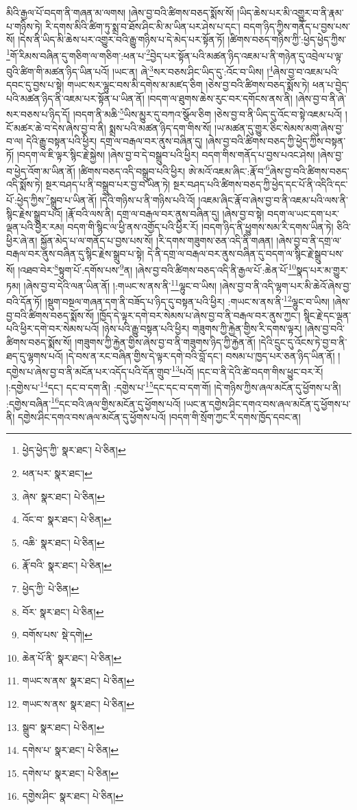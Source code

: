 མིའི་རྒྱལ་པོ་བདག་ནི་གཞན་མ་ལགས། །ཞེས་བྱ་བའི་ཚིགས་བཅད་སྨོས་སོ། །ཡིད་ཆེས་པར་མི་འགྱུར་བ་ནི་རྣམ་པ་གཉིས་ཏེ། རི་དགས་མིའི་ཚིག་ཏུ་སྨྲ་བ་ཐོས་ཤིང་མི་མ་ཡིན་པར་ཤེས་པ་དང་། བདག་ཉིད་ཀྱིས་གནོད་པ་བྱས་པས་སོ། །དེས་ནི་ཡིད་མི་ཆེས་པར་འགྱུར་བའི་རྒྱུ་གཉིས་པ་དེ་མེད་པར་སྟོན་ཏོ། །ཚིགས་བཅད་གཉིས་ཀྱི་:ཕྱེད་ཕྱེད་ཀྱིས་\footnote{ཕྱེད་ཕྱེད་ཀྱི་  སྣར་ཐང་།  པེ་ཅིན། }གོ་རིམས་བཞིན་དུ་གཅིག་ལ་གཅིག་:ཕན་པ་\footnote{ཕན་པར་  སྣར་ཐང་། }བྱེད་པར་སྟོན་པའི་མཚན་ཉིད་འཇམ་པ་ནི་གཉེན་དུ་འབྲེལ་པ་ལྟ་བུའི་ཚིག་གི་མཚན་ཉིད་ཡིན་པའོ། །ཡང་ན། ཞེ་\footnote{ཞེས་  སྣར་ཐང་།  པེ་ཅིན། }སར་བཅས་ཤིང་ཡིད་དུ་:འོང་བ་ཡིས། །\footnote{འོང་བ་  སྣར་ཐང་།  པེ་ཅིན། }ཞེས་བྱ་བ་འཇམ་པའི་དབང་དུ་བྱས་པ་སྟེ། གཡང་སར་ལྷུང་བས་མི་དགེས་མ་མཛད་ཅིག །ཅེས་བྱ་བའི་ཚིགས་བཅད་སྨོས་ཏེ། ཕན་པ་བྱེད་པའི་མཚན་ཉིད་ནི་འཇམ་པར་སྟོན་པ་ཡིན་ནོ། །བདག་ལ་ཐུགས་ཆེས་རུང་བར་དགོངས་ནས་ནི། །ཞེས་བྱ་བ་ནི་ཞེ་སར་བཅས་པ་ཉིད་དོ། །བདག་ནི་མཆི་\footnote{འཆི་  སྣར་ཐང་།  པེ་ཅིན། }ཡིས་མྱུར་དུ་བཀའ་སྩོལ་ཅིག །ཅེས་བྱ་བ་ནི་ཡིད་དུ་འོང་བ་སྟེ་འཇམ་པའོ། །ངོ་མཚར་ཆེ་བ་དེས་ཞེས་བྱ་བ་ནི། སྨྲས་པའི་མཚན་ཉིད་དག་གིས་སོ། །ཡ་མཚན་དུ་གྱུར་ཅིང་སེམས་མགུ་ཞེས་བྱ་བ་ལ། དེའི་རྒྱུ་བསྟན་པའི་ཕྱིར། དགྲ་ལ་བརྒལ་བར་ནུས་བཞིན་དུ། །ཞེས་བྱ་བའི་ཚིགས་བཅད་ཀྱི་ཕྱེད་ཀྱིས་བསྟན་ཏོ། །བདག་ལ་ཇི་ལྟར་སྙིང་རྗེ་སྐྱེས། །ཞེས་བྱ་བ་དེ་བསྒྲུབ་པའི་ཕྱིར། བདག་གིས་གནོད་པ་བྱས་པའང་ཤེས། །ཞེས་བྱ་བ་ཕྱེད་འོག་མ་ཡིན་ནོ། །ཚིགས་བཅད་འདི་བསྒྲུབ་པའི་ཕྱིར། ཨེ་མའོ་འཇམ་ཞིང་:རྣོ་བ་\footnote{རྣོ་བའི་  སྣར་ཐང་།  པེ་ཅིན། }ཞེས་བྱ་བའི་ཚིགས་བཅད་འདི་སྨོས་ཏེ། སྔར་བཤད་པ་ནི་བསྒྲུབ་པར་བྱ་བ་ཡིན་ཏེ། སྔར་བཤད་པའི་ཚིགས་བཅད་ཀྱི་ཕྱེད་དང་པོ་ནི་འདིའི་དང་པོ་:ཕྱེད་ཀྱིས་\footnote{ཕྱེད་ཀྱི་  པེ་ཅིན། }སྒྲུབ་པ་ཡིན་ནོ། །དེའི་གཉིས་པ་ནི་གཉིས་པའི་འོ། །འཇམ་ཞིང་རྣོ་བ་ཞེས་བྱ་བ་ནི་འཇམ་པའི་ལས་ནི་སྙིང་རྗེས་སྒྲུབ་པའོ། །རྣོ་བའི་ལས་ནི། དགྲ་ལ་བརྒལ་བར་ནུས་བཞིན་དུ། །ཞེས་བྱ་བ་སྟེ། བདག་ལ་ཡང་དག་པར་ལྡན་པའི་ཕྱིར་རམ། བདག་གི་སྙིང་ལ་ཕྱི་ནས་འགྱོད་པའི་ཕྱིར་རོ། །བདག་ཉིད་ནི་ཕྱུགས་སམ་རི་དགས་ཡིན་ཏེ། ཅིའི་ཕྱིར་ཞེ་ན། སྐྱོན་མེད་པ་ལ་གནོད་པ་བྱས་པས་སོ། །རི་དགས་གཟུགས་ཅན་འདི་ནི་གཞན། །ཞེས་བྱ་བ་ནི་དགྲ་ལ་བརྒལ་བར་ནུས་བཞིན་དུ་སྙིང་རྗེས་སྒྲུབ་པ་སྟེ། དེ་ནི་དགྲ་ལ་བརྒལ་བར་ནུས་བཞིན་དུ་བདག་ལ་སྙིང་རྗེ་སྒྲུབ་པས་སོ། །འཐབ་བེར་\footnote{བོར་  སྣར་ཐང་།  པེ་ཅིན། }སྟུག་པོ་:དགོས་པས་\footnote{བགོས་པས་  སྡེ་དགེ། }ན། །ཞེས་བྱ་བའི་ཚིགས་བཅད་འདི་ནི་རྒྱལ་པོ་:ཆེན་པོ་\footnote{ཆེན་པོ་ནི་  སྣར་ཐང་།  པེ་ཅིན། }སྣད་པར་མ་གྱུར་ཏམ། །ཞེས་བྱ་བ་དེའི་ལན་ཡིན་ནོ། །:གཡང་ས་ནས་ནི་\footnote{གཡང་ས་ནས་  སྣར་ཐང་།  པེ་ཅིན། }ལྷུང་བ་ཡིས། །ཞེས་བྱ་བ་ནི་འདི་ལྷག་པར་མི་ཆེའོ་ཞེས་བྱ་བའི་དོན་ཏོ། །སྡུག་བསྔལ་གཞན་དག་ནི་བཟོད་པ་ཉིད་དུ་བསྟན་པའི་ཕྱིར། :གཡང་ས་ནས་ནི་\footnote{གཡང་ས་ནས་  སྣར་ཐང་།  པེ་ཅིན། }ལྷུང་བ་ཡིས། །ཞེས་བྱ་བའི་ཚིགས་བཅད་སྨོས་སོ། །ཁྱོད་དེ་ལྟར་དགེ་བར་སེམས་པ་ཞེས་བྱ་བ་ནི་བརྒལ་བར་ནུས་ཀྱང་། སྙིང་རྗེ་དང་ལྡན་པའི་ཕྱིར་དགེ་བར་སེམས་པའོ། །ཉེས་པའི་རྒྱུ་བསྟན་པའི་ཕྱིར། གཟུགས་ཀྱི་རྐྱེན་གྱིས་རི་དགས་ལྟར། །ཞེས་བྱ་བའི་ཚིགས་བཅད་སྨོས་སོ། །གཟུགས་ཀྱི་རྐྱེན་གྱིས་ཞེས་བྱ་བ་ནི་གཟུགས་ཉིད་ཀྱི་རྐྱེན་ནོ། །དེའི་དྲུང་དུ་འོངས་ཏེ་བྱ་བ་ནི་ཐད་དུ་ལྷགས་པའོ། །དེ་བས་ན་རང་བཞིན་གྱིས་དེ་ལྟར་དགེ་བའི་བློ་དང་། བསམ་པ་ཁྱད་པར་ཅན་ཉིད་ཡིན་ནོ། །དགྱེས་པ་ཞེས་བྱ་བ་ནི་མངོན་པར་འདོད་པའི་དོན་གྲུབ་\footnote{སྒྲུབ་  སྣར་ཐང་།  པེ་ཅིན། }པའོ། །དང་བ་ནི་དེའི་ཚེ་བདག་གིས་ཕྱུང་བར་རོ། །:དགྱེས་པ་\footnote{དགེས་པ་  སྣར་ཐང་།  པེ་ཅིན། }དང་། དང་བ་དག་ནི། :དགྱེས་པ་\footnote{དགེས་པ་  སྣར་ཐང་།  པེ་ཅིན། }དང་དང་བ་དག་གོ། །དེ་གཉིས་ཀྱིས་ཞལ་མངོན་དུ་ཕྱོགས་པ་ནི། :དགྱེས་བཞིན་\footnote{དགྱེས་ཤིང་  སྣར་ཐང་།  པེ་ཅིན། }དང་བའི་ཞལ་གྱིས་མངོན་དུ་ཕྱོགས་པའོ། །ཡང་ན་དགྱེས་ཤིང་དགའ་བས་ཞལ་མངོན་དུ་ཕྱོགས་པ་ནི། དགྱེས་ཤིང་དགའ་བས་ཞལ་མངོན་དུ་ཕྱོགས་པའོ། །བདག་གི་སྲོག་ཀྱང་རི་དགས་ཁྱོད་དབང་ན། 